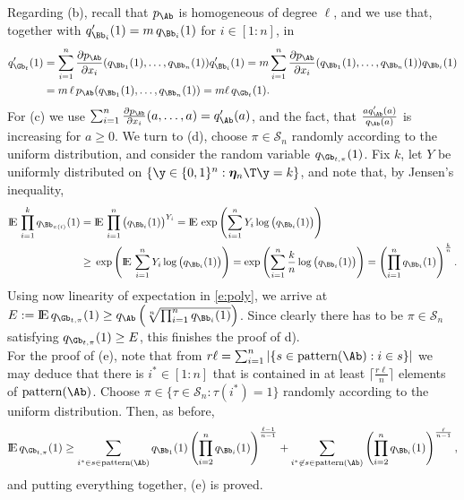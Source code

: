 \documentclass[moor]{informs3}              %
\newcommand{\EE}{{\rm I\!E\,}}
\def\irg#1#2{{ \in\! [{#1}\! : \! {#2}]}}
\begin{document}
Regarding (b), recall that $p_\Ab$ is homogeneous of degree $\ell$, and we use that, together with $q'_{\Bb_i}(1)=m\,q_{\Bb_i}(1)$ for $i\irg 1n$, in
\begin{align*}
q'_{\Gb_t}(1)&{}=\sum_{i=1}^n\frac{\partial p_\Ab}{\partial x_i}(q_{\Bb_1}(1),\ldots,q_{\Bb_n}(1))q'_{\Bb_i}(1)
=m\sum_{i=1}^n\frac{\partial p_\Ab}{\partial x_i}(q_{\Bb_1}(1),\ldots,q_{\Bb_n}(1))q_{\Bb_i}(1)\\
&{}=m\,\ell\, p_\Ab(q_{\Bb_1}(1),\ldots,q_{\Bb_n}(1))=m\ell\,q_{\Gb_t}(1).
\end{align*}
For (c) we use $\sum_{i=1}^n\frac{\partial p_\Ab}{\partial x_i}(a,\ldots,a)=q'_{\Ab}(a)$, and the fact, that $\frac{aq'_{\Ab}(a)}{q_{\Ab}(a)}$ is increasing for $a\ge0$.
We turn to (d), choose $\pi\in\mathcal{S}_n$ randomly according to the uniform distribution, and consider the random variable $q_{\Gb_{t,\pi}}(1)$.
Fix $k$, let $Y$ be uniformly distributed on $\{\y\in\{0,1\}^n:\bm{\eta}_n\T\y=k\}$, and note that, by Jensen's inequality,
\begin{align*}\EE \prod_{i=1}^kq_{\Bb_{\pi(i)}}(1)={}&\EE \prod_{i=1}^n\big(q_{\Bb_i}(1)\big)^{Y_i}=\EE \exp\left(\sum_{i=1}^nY_i\log\big(q_{\Bb_i}(1)\big)\right)\\
\ge{}&\exp\left(\EE\sum_{i=1}^nY_i\log\big(q_{\Bb_i}(1)\big)\right)=\exp\left(\sum_{i=1}^n\frac kn\log\big(q_{\Bb_i}(1)\big)\right)=\left(\prod_{i=1}^nq_{\Bb_i}(1)\right)^{\frac kn}.\end{align*}
Using now linearity of expectation in \eqref{e:poly}, we arrive at $E:=\EE q_{\Gb_{t,\pi}}(1)\ge q_\Ab\left(\sqrt[n]{\prod_{i=1}^nq_{\Bb_i}(1)}\right)$.
Since clearly there has to be $\pi\in\mathcal{S}_n$ satisfying $q_{\Gb_{t,\pi}}(1)\ge E$, this finishes the proof of d).\\
For the proof of (e), note that from $r\ell=\sum_{i=1}^n|\{s\in\textup{pattern}(\Ab):i\in s\}|$ we may deduce that there is $i^*\irg 1n$ that is contained in at least $\lceil \frac{r\ell}n\rceil$ elements of $\textup{pattern}(\Ab)$.
Choose $\pi\in\{\tau\in\mathcal{S}_n:\tau(i^*)=1\}$ randomly according to the uniform distribution. Then, as before,
$$\EE q_{\Gb_{t,\pi}}(1)\ge \sum_{i^*\in s\in\textup{pattern}(\Ab)}q_{\Bb_1}(1)\left({\prod_{i=2}^nq_{\Bb_i}(1)}\right)^{\frac{\ell-1}{n-1}}
+ \sum_{i^*\not\in s\in\textup{pattern}(\Ab)}\left({\prod_{i=2}^nq_{\Bb_i}(1)}\right)^{\frac{\ell}{n-1}},$$
and putting everything together, (e) is proved.
\ep
\end{document}
